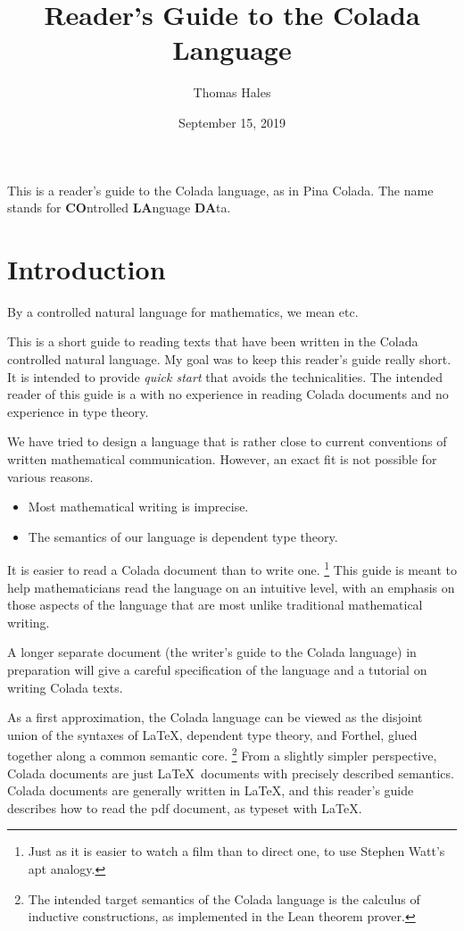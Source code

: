 \documentclass[12pt]{article}
\title{Reader's Guide to the Colada Language}
\date{September 15, 2019}
\author{Thomas Hales}
\numberwithin{definition}{section}
\begin{document}
\maketitle

\setcounter{tocdepth}{1}
\tableofcontents
\newpage

\newcommand{\Nat}{{\mathbb N}}
\newcommand{\Int}{{\mathbb Z}}
\newcommand{\Real}{{\mathbb R}}

This is a reader's guide to the Colada language, as in Pina Colada.  The name
stands for {\bf CO}ntrolled {\bf LA}nguage {\bf DA}ta.

\section{Introduction}
By a controlled natural language for mathematics, we mean etc.

This is a short guide to reading texts that have been written in the
Colada controlled natural language.  My goal was to keep this reader's
guide really short.  It is intended to provide \emph{quick start} that
avoids the technicalities.  The intended reader of this guide is a
with no experience in reading Colada documents and no experience in type theory.

We have tried to design a language that is rather close to current
conventions of written mathematical communication.  However, an exact
fit is not possible for various reasons.

\begin{itemize}
\item Most mathematical writing is imprecise.
\item The semantics of our language is dependent type theory.
\end{itemize}

It is easier to read a Colada document than to write one.%
\footnote{Just as it is easier to watch a film than to direct one, to
  use Stephen Watt's apt analogy.}  
%
This guide is meant to help mathematicians read the language on an
intuitive level, with an emphasis on those aspects of the language
that are most unlike traditional mathematical writing.

A longer separate document (the writer's guide to the Colada language)
in preparation will give a careful specification of the language and a
tutorial on writing Colada texts.

As a first approximation, the Colada language can be viewed as the
disjoint union of the syntaxes of \LaTeX, dependent type theory, and
Forthel, glued together along a common semantic core.%
%
\footnote{The intended target semantics of the Colada language is the
  calculus of inductive constructions, as implemented in the Lean
  theorem prover.}
%
From a slightly simpler perspective, Colada documents are just
\LaTeX\ documents with precisely described semantics.  Colada documents are
generally written in \LaTeX, and this reader's guide describes how to
read the pdf document, as typeset with \LaTeX.
\end{document}
